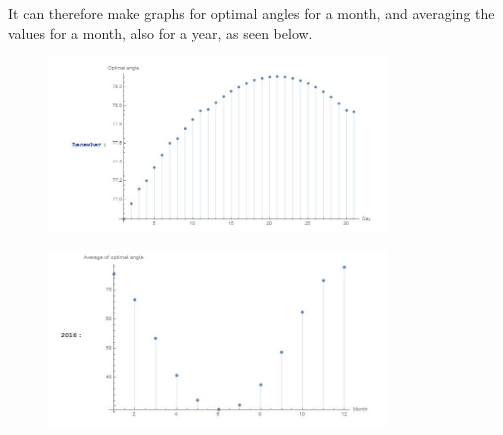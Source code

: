 \documentclass{article}
\begin{document}
			   It can therefore make graphs for optimal angles for a month, and averaging the values for a month, also for a year, as seen below.
			   \begin{figure}[h]
			   	\centering
			   	\includegraphics[width=0.8\textwidth]{graph_dec.JPG}
			   	\label{fig:graph_dec}
			   \end{figure}
			   \begin{figure}[h]
			   	\centering
			   	\includegraphics[width=0.8\textwidth]{graph_2016.JPG}
			   	\label{fig:graph_dec}
			   \end{figure}
			   	
\end{document}
